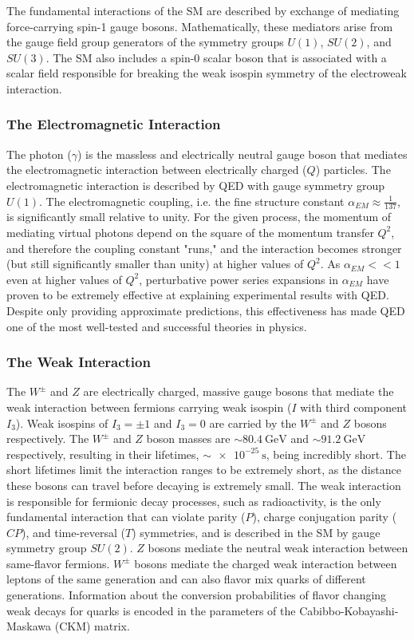 The fundamental interactions of the SM are described by exchange of mediating force-carrying spin-1 gauge bosons.
Mathematically, these mediators arise from the gauge field group generators of the symmetry groups $U(1)$, $SU(2)$, and $SU(3)$.
The SM also includes a spin-0 scalar boson that is associated with a scalar field responsible for breaking the weak isospin symmetry of the electroweak interaction.

\subsubsection{The Electromagnetic Interaction}
The photon ($\gamma$) is the massless and electrically neutral gauge boson that mediates the electromagnetic interaction between electrically charged ($Q$) particles.
The electromagnetic interaction is described by QED with gauge symmetry group $U(1)$.
The electromagnetic coupling, i.e. the fine structure constant $\alpha_{EM} \approx \frac{1}{137}$, is significantly small relative to unity.
For the given process, the momentum of mediating virtual photons depend on the square of the momentum transfer $Q^2$, and therefore the coupling constant "runs," and the interaction becomes stronger (but still significantly smaller than unity) at higher values of $Q^2$.
As $\alpha_{EM} << 1$ even at higher values of $Q^2$, perturbative power series expansions in $\alpha_{EM}$ have proven to be extremely effective at explaining experimental results with QED.
Despite only providing approximate predictions, this effectiveness has made QED one of the most well-tested and successful theories in physics.

\subsubsection{The Weak Interaction}
The $W^\pm$ and $Z$ are electrically charged, massive gauge bosons that mediate the weak interaction between fermions carrying weak isospin ($I$ with third component $I_3$).
Weak isospins of $I_3 = \pm 1$ and $I_3 = 0$ are carried by the $W^\pm$ and $Z$ bosons respectively.
The $W^\pm$ and $Z$ boson masses are $\sim \SI{80.4}{\GeV}$ and $\sim \SI{91.2}{\GeV}$ respectively, resulting in their lifetimes, $\sim \SI{e-25}{\s}$, being incredibly short.
The short lifetimes limit the interaction ranges to be extremely short, as the distance these bosons can travel before decaying is extremely small.
The weak interaction is responsible for fermionic decay processes, such as radioactivity, is the only fundamental interaction that can violate parity ($P$), charge conjugation parity ($CP$), and time-reversal ($T$) symmetries, and is described in the SM by gauge symmetry group $SU(2)$.
$Z$ bosons mediate the neutral weak interaction between same-flavor fermions.
$W^\pm$ bosons mediate the charged weak interaction between leptons of the same generation and can also flavor mix quarks of different generations.
Information about the conversion probabilities of flavor changing weak decays for quarks is encoded in the parameters of the Cabibbo-Kobayashi-Maskawa (CKM) matrix.

